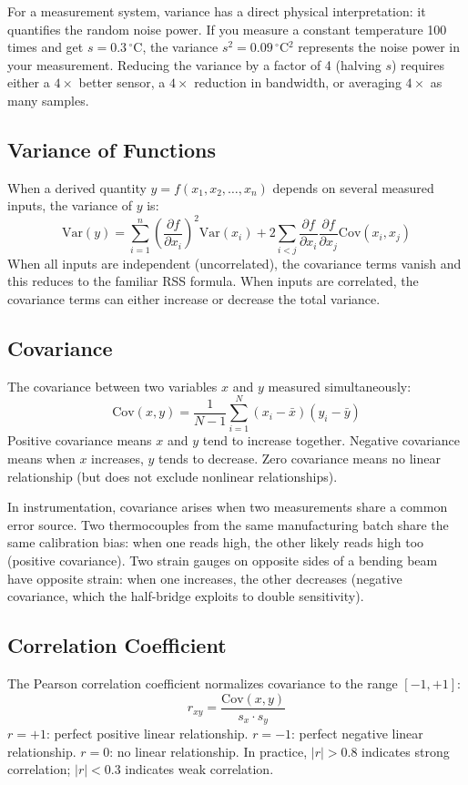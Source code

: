 \documentclass[11pt,letterpaper,twoside,openany]{book}
\newcommand{\degC}{\ensuremath{{}^{\circ}\text{C}}}
\begin{document}
For a measurement system, variance has a direct physical interpretation: it quantifies the random noise power. If you measure a constant temperature 100 times and get $s = 0.3$\,\degC{}, the variance $s^2 = 0.09$\,\degC{}$^2$ represents the noise power in your measurement. Reducing the variance by a factor of 4 (halving $s$) requires either a $4\times$ better sensor, a $4\times$ reduction in bandwidth, or averaging $4\times$ as many samples.

\subsection{Variance of Functions}
When a derived quantity $y = f(x_1, x_2, \ldots, x_n)$ depends on several measured inputs, the variance of $y$ is:
\begin{equation}
\text{Var}(y) = \sum_{i=1}^{n}\left(\frac{\partial f}{\partial x_i}\right)^2 \text{Var}(x_i) + 2\sum_{i<j}\frac{\partial f}{\partial x_i}\frac{\partial f}{\partial x_j}\text{Cov}(x_i, x_j)
\end{equation}
When all inputs are independent (uncorrelated), the covariance terms vanish and this reduces to the familiar RSS formula. When inputs are correlated, the covariance terms can either increase or decrease the total variance.

\subsection{Covariance}
The covariance between two variables $x$ and $y$ measured simultaneously:
\begin{equation}
\text{Cov}(x, y) = \frac{1}{N-1}\sum_{i=1}^{N}(x_i - \bar{x})(y_i - \bar{y})
\end{equation}
Positive covariance means $x$ and $y$ tend to increase together. Negative covariance means when $x$ increases, $y$ tends to decrease. Zero covariance means no linear relationship (but does not exclude nonlinear relationships).

In instrumentation, covariance arises when two measurements share a common error source. Two thermocouples from the same manufacturing batch share the same calibration bias: when one reads high, the other likely reads high too (positive covariance). Two strain gauges on opposite sides of a bending beam have opposite strain: when one increases, the other decreases (negative covariance, which the half-bridge exploits to double sensitivity).

\subsection{Correlation Coefficient}
The Pearson correlation coefficient normalizes covariance to the range $[-1, +1]$:
\begin{equation}
r_{xy} = \frac{\text{Cov}(x, y)}{s_x \cdot s_y}
\end{equation}
$r = +1$: perfect positive linear relationship. $r = -1$: perfect negative linear relationship. $r = 0$: no linear relationship. In practice, $|r| > 0.8$ indicates strong correlation; $|r| < 0.3$ indicates weak correlation.
\end{document}
